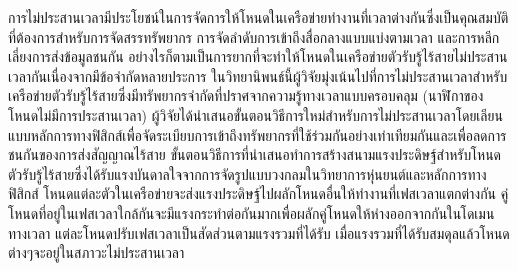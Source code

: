\begin{thaiabstract}
\RaggedRight การ{\wbr}ไม่{\wbr}ประสาน{\wbr}เวลา{\wbr}มี{\wbr}ประโยชน์{\wbr}ใน{\wbr}การ{\wbr}จัดการ{\wbr}ให้{\wbr}โหน{\wbr}ด{\wbr}ใน{\wbr}เครือข่าย{\wbr}ทำงาน{\wbr}ที่{\wbr}เวลา{\wbr}ต่าง{\wbr}กัน{\wbr}ซึ่ง{\wbr}เป็นคุณ{\wbr}สมบัติ{\wbr}ที่{\wbr}ต้องการ{\wbr}สำหรับ{\wbr}การ{\wbr}จัดสรร{\wbr}ทรัพยากร การ{\wbr}จัด{\wbr}ลำดับ{\wbr}การ{\wbr}เข้าถึง{\wbr}สื่อกลาง{\wbr}แบบ{\wbr}แบ่ง{\wbr}ตาม{\wbr}เวลา และ{\wbr}การ{\wbr}หลีกเลี่ยง{\wbr}การ{\wbr}ส่ง{\wbr}ข้อมูล{\wbr}ชน{\wbr}กัน อย่างไรก็ตาม{\wbr}เป็น{\wbr}การ{\wbr}ยาก{\wbr}ที่{\wbr}จะ{\wbr}ทำ{\wbr}ให้{\wbr}โหน{\wbr}ด{\wbr}ใน{\wbr}เครือข่าย{\wbr}ตัวรับ{\wbr}รู้{\wbr}ไร้{\wbr}สาย{\wbr}ไม่{\wbr}ประสาน{\wbr}เวลา{\wbr}กัน{\wbr}เนื่องจาก{\wbr}มี{\wbr}ข้อจำกัด{\wbr}หลาย{\wbr}ประการ ใน{\wbr}วิทยานิพนธ์{\wbr}นี้{\wbr}ผู้{\wbr}วิจัยมุ่งเน้น{\wbr}ไป{\wbr}ที่{\wbr}การ{\wbr}ไม่{\wbr}ประสาน{\wbr}เวลา{\wbr}สำหรับ{\wbr}เครือข่าย{\wbr}ตัวรับ{\wbr}รู้{\wbr}ไร้{\wbr}สาย{\wbr}ซึ่ง{\wbr}มี{\wbr}ทรัพยากร{\wbr}จำกัด{\wbr}ที่{\wbr}ปราศจาก{\wbr}ความ{\wbr}รู้{\wbr}ทาง{\wbr}เวลา{\wbr}แบบ{\wbr}ครอบคลุม (นาฬิกา{\wbr}ของ{\wbr}โหน{\wbr}ด{\wbr}ไม่{\wbr}มี{\wbr}การ{\wbr}ประสาน{\wbr}เวลา) ผู้{\wbr}วิจัย{\wbr}ได้{\wbr}นำเสนอ{\wbr}ขั้นตอนวิธี{\wbr}การ{\wbr}ใหม่{\wbr}สำหรับ{\wbr}การ{\wbr}ไม่{\wbr}ประสาน{\wbr}เวลา{\wbr}โดย{\wbr}เลียน{\wbr}แบบ{\wbr}หลักการ{\wbr}ทาง{\wbr}ฟิสิกส์{\wbr}เพื่อ{\wbr}จัด{\wbr}ระเบียบการ{\wbr}เข้าถึง{\wbr}ทรัพยากร{\wbr}ที่{\wbr}ใช้{\wbr}ร่วม{\wbr}กัน{\wbr}อย่าง{\wbr}เท่าเทียม{\wbr}กัน{\wbr}และ{\wbr}เพื่อ{\wbr}ลด{\wbr}การ{\wbr}ชน{\wbr}กัน{\wbr}ของ{\wbr}การ{\wbr}ส่ง{\wbr}สัญญาณ{\wbr}ไร้{\wbr}สาย ขั้นตอนวิธี{\wbr}การ{\wbr}ที่{\wbr}นำเสนอ{\wbr}ทำ{\wbr}การ{\wbr}สร้าง{\wbr}สนาม{\wbr}แรง{\wbr}ประดิษฐ์{\wbr}สำหรับ{\wbr}โหน{\wbr}ด{\wbr}ตัวรับ{\wbr}รู้{\wbr}ไร้{\wbr}สาย{\wbr}ซึ่ง{\wbr}ได้{\wbr}รับ{\wbr}แรง{\wbr}บันดาลใจ{\wbr}จาก{\wbr}การ{\wbr}จัด{\wbr}รูปแบบ{\wbr}วง{\wbr}กลม{\wbr}ใน{\wbr}วิทยาการ{\wbr}หุ่นยนต์{\wbr}และ{\wbr}หลักการ{\wbr}ทาง{\wbr}ฟิสิกส์ โหน{\wbr}ด{\wbr}แต่ละ{\wbr}ตัว{\wbr}ใน{\wbr}เครือข่าย{\wbr}จะ{\wbr}ส่ง{\wbr}แรง{\wbr}ประดิษฐ์{\wbr}ไป{\wbr}ผลัก{\wbr}โหน{\wbr}ด{\wbr}อื่น{\wbr}ให้{\wbr}ทำงาน{\wbr}ที่{\wbr}เฟส{\wbr}เวลา{\wbr}แตกต่าง{\wbr}กัน คู่{\wbr}โหน{\wbr}ด{\wbr}ที่อยู่{\wbr}ใน{\wbr}เฟส{\wbr}เวลา{\wbr}ใกล้{\wbr}กัน{\wbr}จะ{\wbr}มี{\wbr}แรง{\wbr}กระทำ{\wbr}ต่อ{\wbr}กัน{\wbr}มาก{\wbr}เพื่อ{\wbr}ผลัก{\wbr}คู่{\wbr}โหน{\wbr}ด{\wbr}ให้{\wbr}ห่าง{\wbr}ออก{\wbr}จาก{\wbr}กัน{\wbr}ใน{\wbr}โด{\wbr}เมน{\wbr}ทาง{\wbr}เวลา{\wbr}
แต่ละ{\wbr}โหน{\wbr}ด{\wbr}ปรับ{\wbr}เฟส{\wbr}เวลา{\wbr}เป็น{\wbr}สัดส่วน{\wbr}ตาม{\wbr}แรง{\wbr}รวม{\wbr}ที่{\wbr}ได้{\wbr}รับ เมื่อ{\wbr}แรง{\wbr}รวม{\wbr}ที่{\wbr}ได้{\wbr}รับ{\wbr}สม{\wbr}ดุล{\wbr}แล้ว{\wbr}โหน{\wbr}ดต่างๆ{\wbr}จะ{\wbr}อยู่{\wbr}ใน{\wbr}สภาวะ{\wbr}ไม่{\wbr}ประสาน{\wbr}เวลา{\wbr}

\end{thaiabstract}
